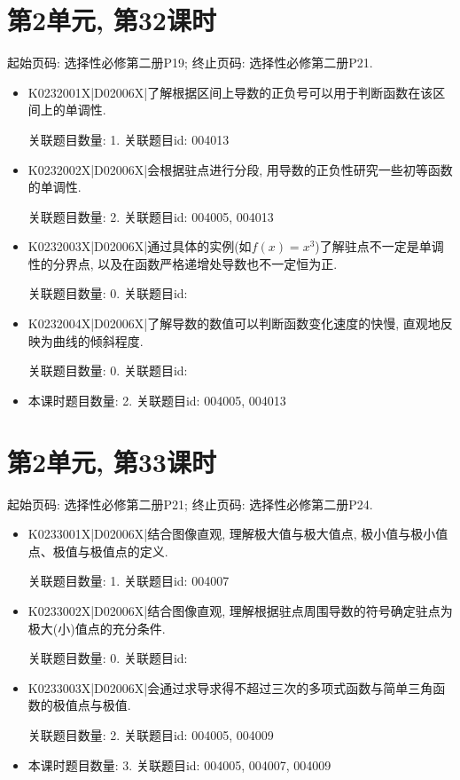 \section*{第2单元, 第32课时}
起始页码: 选择性必修第二册P19; 终止页码: 选择性必修第二册P21.
\begin{itemize}
\item K0232001X|D02006X|了解根据区间上导数的正负号可以用于判断函数在该区间上的单调性.

关联题目数量: 1. 关联题目id: 004013

\item K0232002X|D02006X|会根据驻点进行分段, 用导数的正负性研究一些初等函数的单调性.

关联题目数量: 2. 关联题目id: 004005, 004013

\item K0232003X|D02006X|通过具体的实例(如$f(x)=x^3$)了解驻点不一定是单调性的分界点, 以及在函数严格递增处导数也不一定恒为正.

关联题目数量: 0. 关联题目id: 

\item K0232004X|D02006X|了解导数的数值可以判断函数变化速度的快慢, 直观地反映为曲线的倾斜程度.

关联题目数量: 0. 关联题目id: 

\item 本课时题目数量: 2. 关联题目id: 004005, 004013

\end{itemize}

\section*{第2单元, 第33课时}
起始页码: 选择性必修第二册P21; 终止页码: 选择性必修第二册P24.
\begin{itemize}
\item K0233001X|D02006X|结合图像直观, 理解极大值与极大值点, 极小值与极小值点、极值与极值点的定义.

关联题目数量: 1. 关联题目id: 004007

\item K0233002X|D02006X|结合图像直观, 理解根据驻点周围导数的符号确定驻点为极大(小)值点的充分条件.

关联题目数量: 0. 关联题目id: 

\item K0233003X|D02006X|会通过求导求得不超过三次的多项式函数与简单三角函数的极值点与极值.

关联题目数量: 2. 关联题目id: 004005, 004009

\item 本课时题目数量: 3. 关联题目id: 004005, 004007, 004009

\end{itemize}

